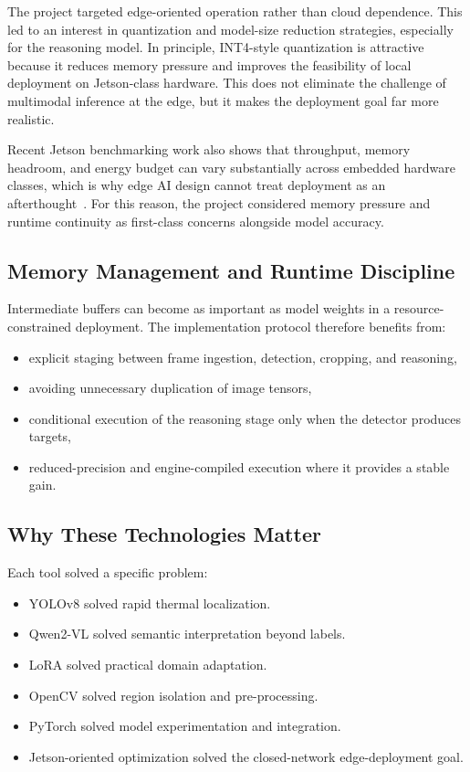 The project targeted edge-oriented operation rather than cloud dependence. This led to an
interest in quantization and model-size reduction strategies, especially for the reasoning
model. In principle, INT4-style quantization is attractive because it reduces memory pressure
and improves the feasibility of local deployment on Jetson-class hardware. This does not
eliminate the challenge of multimodal inference at the edge, but it makes the deployment goal
far more realistic.

Recent Jetson benchmarking work also shows that throughput, memory headroom, and energy
budget can vary substantially across embedded hardware classes, which is why edge AI design
cannot treat deployment as an afterthought~\cite{pham2023}. For this reason, the project
considered memory pressure and runtime continuity as first-class concerns alongside model
accuracy.

\subsection{Memory Management and Runtime Discipline}

Intermediate buffers can become as important as model weights in a
resource-constrained deployment. The implementation protocol therefore benefits from:

\begin{itemize}[nosep]
  \item explicit staging between frame ingestion, detection, cropping, and reasoning,
  \item avoiding unnecessary duplication of image tensors,
  \item conditional execution of the reasoning stage only when the detector produces targets,
  \item reduced-precision and engine-compiled execution where it provides a stable gain.
\end{itemize}

\subsection{Why These Technologies Matter}

Each tool solved a specific problem:

\begin{itemize}[nosep]
  \item YOLOv8 solved rapid thermal localization.
  \item Qwen2-VL solved semantic interpretation beyond labels.
  \item LoRA solved practical domain adaptation.
  \item OpenCV solved region isolation and pre-processing.
  \item PyTorch solved model experimentation and integration.
  \item Jetson-oriented optimization solved the closed-network edge-deployment goal.
\end{itemize}
